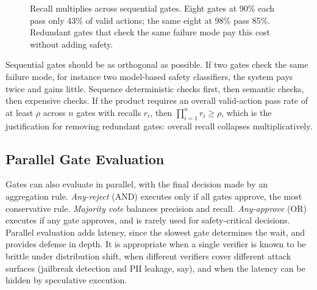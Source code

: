 \documentclass[11pt]{book}
\begin{document}
\begin{figure}[htbp]
\centering
{}
\caption{Recall multiplies across sequential gates. Eight gates at 90\% each pass only 43\% of valid actions; the same eight at 98\% pass 85\%. Redundant gates that check the same failure mode pay this cost without adding safety.}
\label{fig:gate-recall}
\end{figure}

Sequential gates should be as orthogonal as possible. If two gates check the same failure mode, for instance two model-based safety classifiers, the system pays twice and gains little. Sequence deterministic checks first, then semantic checks, then expensive checks. If the product requires an overall valid-action pass rate of at least $\rho$ across $n$ gates with recalls $r_i$, then $\prod_{i=1}^n r_i \geq \rho$, which is the justification for removing redundant gates: overall recall collapses multiplicatively.

\subsection{Parallel Gate Evaluation}

Gates can also evaluate in parallel, with the final decision made by an aggregation rule. \textit{Any-reject} (AND) executes only if all gates approve, the most conservative rule. \textit{Majority vote} balances precision and recall. \textit{Any-approve} (OR) executes if any gate approves, and is rarely used for safety-critical decisions. Parallel evaluation adds latency, since the slowest gate determines the wait, and provides defense in depth. It is appropriate when a single verifier is known to be brittle under distribution shift, when different verifiers cover different attack surfaces (jailbreak detection and PII leakage, say), and when the latency can be hidden by speculative execution.
\end{document}
